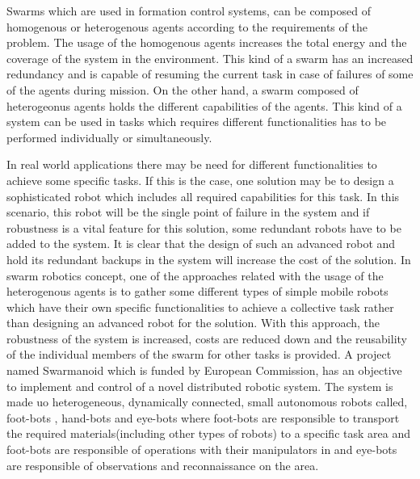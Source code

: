 \documentclass[twoside]{article}
\begin{document}
Swarms which are used in formation control systems, can be composed of homogenous or heterogenous agents according to the requirements of the problem. The usage of the homogenous agents increases the total energy and the coverage of the system in the environment. This kind of a swarm has an increased redundancy and is capable of resuming the current task in case of failures of some of the agents during mission. On the other hand, a swarm composed of heterogeonus agents holds the different capabilities of the agents. This kind of a system can be used in tasks which requires different functionalities has to be performed individually or simultaneously.\newline

In real world applications there may be need for different  functionalities to achieve some specific tasks. If this is the case, one solution may be to design a sophisticated robot which includes all required capabilities for this task. In this scenario, this robot will be the single point of failure in the system and if robustness is a  vital feature for this solution, some redundant robots have to be added to the system. It is clear that the design of such an advanced robot and hold its redundant backups in the system will increase the cost of the solution. In swarm robotics concept, one of the approaches related with the usage of the heterogenous agents is to gather some different types of simple mobile robots which have their own specific functionalities to achieve a collective task rather than designing an advanced robot for the solution. With this approach, the robustness of the system is increased, costs are reduced down and the reusability of the individual members of the swarm for other tasks is provided.  A project named Swarmanoid which is funded by European Commission, has an objective to implement and control of a novel distributed robotic system. The system is made uo heterogeneous, dynamically connected, small autonomous robots called,  foot-bots , hand-bots and eye-bots where foot-bots are responsible to transport the required materials(including other types of robots) to a specific task area and foot-bots are responsible of operations with their manipulators in and eye-bots are responsible of observations and reconnaissance on the area.
\end{document}
